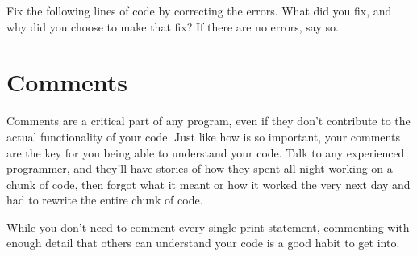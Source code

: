 \begin{Exercise}
Fix the following lines of code by correcting the  errors. What did you fix, and why did you choose to make that fix? If there are no errors, say so.
\end{Exercise}
\section{Comments}
Comments are a critical part of any program, even if they don't contribute to the actual functionality of your code. Just like how  is so important, your comments are the key for you being able to understand your code. Talk to any experienced programmer, and they'll have stories of how they spent all night working on a chunk of code, then forgot what it meant or how it worked the very next day and had to rewrite the entire chunk of code.\par
While you don't need to comment every single print statement, commenting with enough detail that others can understand your code is a good habit to get into.\par
